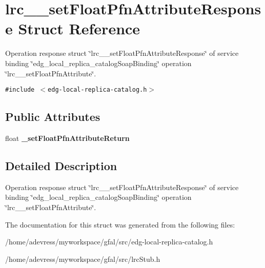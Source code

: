 \section{lrc\_\-\_\-set\-Float\-Pfn\-Attribute\-Response Struct Reference}
\label{structlrc____setFloatPfnAttributeResponse}
Operation response struct \char`\"{}lrc\_\-\_\-set\-Float\-Pfn\-Attribute\-Response\char`\"{} of service binding \char`\"{}edg\_\-local\_\-replica\_\-catalog\-Soap\-Binding\char`\"{} operation \char`\"{}lrc\_\-\_\-set\-Float\-Pfn\-Attribute\char`\"{}.  


{\tt \#include $<$edg-local-replica-catalog.h$>$}

\subsection*{Public Attributes}
\begin{CompactItemize}
\item 
float \textbf{\_\-set\-Float\-Pfn\-Attribute\-Return}\label{structlrc____setFloatPfnAttributeResponse_0bc49d641b003fb578915d7f46bf7603}

\end{CompactItemize}


\subsection{Detailed Description}
Operation response struct \char`\"{}lrc\_\-\_\-set\-Float\-Pfn\-Attribute\-Response\char`\"{} of service binding \char`\"{}edg\_\-local\_\-replica\_\-catalog\-Soap\-Binding\char`\"{} operation \char`\"{}lrc\_\-\_\-set\-Float\-Pfn\-Attribute\char`\"{}. 



The documentation for this struct was generated from the following files:\begin{CompactItemize}
\item 
/home/adevress/myworkspace/gfal/src/edg-local-replica-catalog.h\item 
/home/adevress/myworkspace/gfal/src/lrc\-Stub.h\end{CompactItemize}
